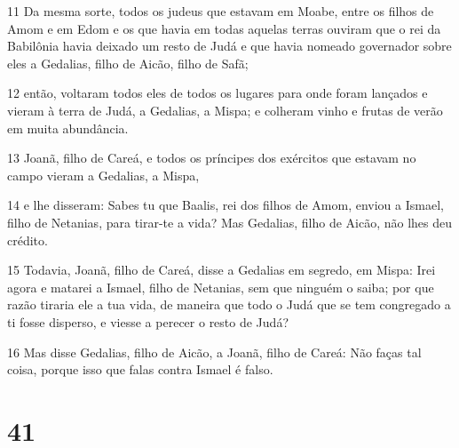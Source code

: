 \par 11 Da mesma sorte, todos os judeus que estavam em Moabe, entre os filhos de Amom e em Edom e os que havia em todas aquelas terras ouviram que o rei da Babilônia havia deixado um resto de Judá e que havia nomeado governador sobre eles a Gedalias, filho de Aicão, filho de Safã;
\par 12 então, voltaram todos eles de todos os lugares para onde foram lançados e vieram à terra de Judá, a Gedalias, a Mispa; e colheram vinho e frutas de verão em muita abundância.
\par 13 Joanã, filho de Careá, e todos os príncipes dos exércitos que estavam no campo vieram a Gedalias, a Mispa,
\par 14 e lhe disseram: Sabes tu que Baalis, rei dos filhos de Amom, enviou a Ismael, filho de Netanias, para tirar-te a vida? Mas Gedalias, filho de Aicão, não lhes deu crédito.
\par 15 Todavia, Joanã, filho de Careá, disse a Gedalias em segredo, em Mispa: Irei agora e matarei a Ismael, filho de Netanias, sem que ninguém o saiba; por que razão tiraria ele a tua vida, de maneira que todo o Judá que se tem congregado a ti fosse disperso, e viesse a perecer o resto de Judá?
\par 16 Mas disse Gedalias, filho de Aicão, a Joanã, filho de Careá: Não faças tal coisa, porque isso que falas contra Ismael é falso.

\chapter{41}

